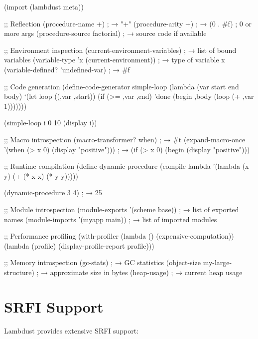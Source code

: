 \begin{example}
\begin{lambdustcode}
(import (lambdust meta))

;; Reflection
(procedure-name +)                       ; → "+"
(procedure-arity +)                      ; → (0 . #f) ; 0 or more args
(procedure-source factorial)             ; → source code if available

;; Environment inspection
(current-environment-variables)          ; → list of bound variables
(variable-type 'x (current-environment)) ; → type of variable x
(variable-defined? 'undefined-var)       ; → #f

;; Code generation
(define-code-generator simple-loop
  (lambda (var start end body)
    `(let loop ((,var ,start))
       (if (>= ,var ,end)
           'done
           (begin ,body (loop (+ ,var 1)))))))

(simple-loop i 0 10 (display i))

;; Macro introspection  
(macro-transformer? when)                ; → #t
(expand-macro-once '(when (> x 0) (display "positive")))
; → (if (> x 0) (begin (display "positive")))

;; Runtime compilation
(define dynamic-procedure 
  (compile-lambda '(lambda (x y) (+ (* x x) (* y y)))))

(dynamic-procedure 3 4)                  ; → 25

;; Module introspection
(module-exports '(scheme base))          ; → list of exported names
(module-imports '(myapp main))           ; → list of imported modules

;; Performance profiling
(with-profiler
  (lambda ()
    (expensive-computation))
  (lambda (profile)
    (display-profile-report profile)))

;; Memory introspection
(gc-stats)                               ; → GC statistics
(object-size my-large-structure)         ; → approximate size in bytes
(heap-usage)                             ; → current heap usage
\end{lambdustcode}
\end{example}

\section{SRFI Support}
\label{sec:srfi-support}


Lambdust provides extensive SRFI support:

